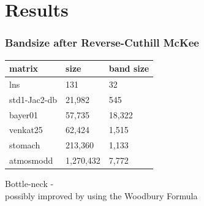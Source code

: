 \documentclass{beamer}
\begin{document}


\section{Results}

\begin{frame}
\frametitle{Bandsize after Reverse-Cuthill McKee}


\vspace{.2in}

\begin{minipage}{.7\textwidth}
\begin{center}
\begin{tabular}{| l | l | l |}
\hline
matrix             & size        & band size \\
\hline
lns                  & 131         &     32   \\
std1-Jac2-db  & 21,982    &  545  \\
bayer01          & 57,735    &   18,322   \\
venkat25        & 62,424     &  1,515   \\
stomach         & 213,360   &    1,133  \\
atmosmodd    & 1,270,432 &   7,772  \\
\hline
\end{tabular}
\end{center}
\end{minipage}
\begin{minipage}{.29\textwidth}
Bottle-neck - \\ possibly improved by using the Woodbury Formula
\end{minipage}

\end{frame}


\end{document}
